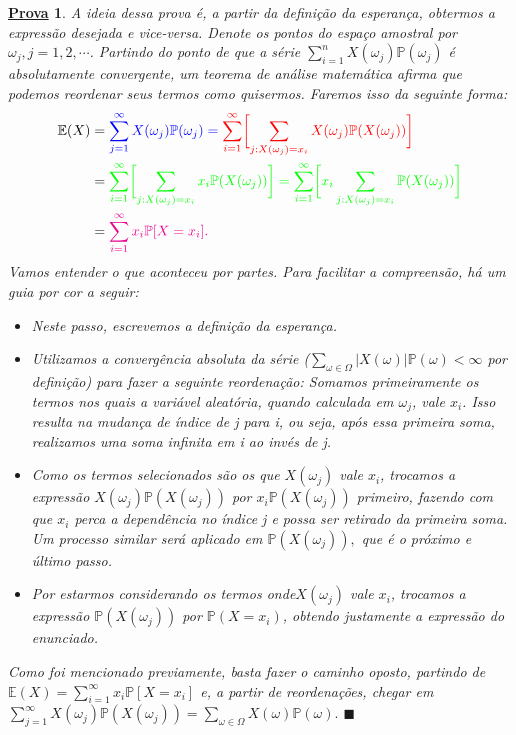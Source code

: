 \documentclass{article}
\newtheorem*{proof*}{\underline{Prova}}
\renewcommand\qedsymbol{$\blacksquare$}
\begin{document}
\begin{proof*}
  A ideia dessa prova é, a partir da definição da esperança, obtermos a expressão desejada e vice-versa.
  Denote os pontos do espaço amostral por \(\omega_{j}, j=1, 2, \cdots\). Partindo do ponto de que a série 
  \(\sum\limits_{i=1}^{n}X(\omega_{j})\mathbb{P}(\omega_{j})\) é absolutamente convergente, um teorema de análise
  matemática afirma que podemos reordenar seus termos como quisermos. Faremos isso da seguinte forma:
  \begin{align*}
    \mathbb{E}(X) &= \color{blue}\sum\limits_{j=1}^{\infty}X(\omega_{j})\mathbb{P}(\omega_{j}) = \color{red}\sum\limits_{i=1}^{\infty}\biggl[\sum\limits_{j:X(\omega_{j})=x_{i}}^{}X(\omega_{j})\mathbb{P}(X(\omega_{j}))\biggr]\\
                  &= \color{green}\sum\limits_{i=1}^{\infty}\biggl[\sum\limits_{j:X(\omega_{j}) = x_{i}}^{}x_{i}\mathbb{P}(X(\omega_{j}))\biggr]=\sum\limits_{i=1}^{\infty}\biggl[x_{i}\sum\limits_{j:X(\omega_{j})=x_{i}}^{}\mathbb{P}(X(\omega_{j}))\biggr]\\
                  &= \color{magenta}\sum\limits_{i=1}^{\infty}x_{i}\mathbb{P}[X = x_{i}].
  \end{align*}
  Vamos entender o que aconteceu por partes. Para facilitar a compreensão, há um guia por cor a seguir:
  \begin{itemize}
    \item[\textbf{Azul)}] Neste passo, escrevemos a definição da esperança.
    \item[\textbf{Vermelho)}] Utilizamos a convergência absoluta da série (\(\sum\limits_{\omega \in \Omega }^{}|X(\omega )|\mathbb{P}(\omega ) < \infty\) por definição) para
      fazer a seguinte reordenação: Somamos primeiramente os termos nos quais a variável aleatória, quando calculada em \(\omega_{j}\), vale \(x_{i}\). Isso resulta na mudança de índice de j
      para i, ou seja, após essa primeira soma, realizamos uma soma infinita em i ao invés de j.
    \item[\textbf{Verde)}] Como os termos selecionados são os que \(X(\omega_{j})\) vale \(x_{i}\), trocamos a expressão \(X(\omega_{j})\mathbb{P}(X(\omega_{j}))\) por
      \(x_{i}\mathbb{P}(X(\omega_{j}))\) primeiro, fazendo com que \(x_{i}\) perca a dependência no índice j e possa ser retirado da primeira soma. Um processo similar será aplicado em
      \(\mathbb{P}(X(\omega_{j})),\) que é o próximo e último passo.
    \item[\textbf{Magenta)}] Por estarmos considerando os termos onde\(X(\omega_{j})\) vale \(x_{i}\), trocamos a expressão \(\mathbb{P}(X(\omega_{j}))\) por \(\mathbb{P}(X = x_{i})\), 
      obtendo justamente a expressão do enunciado.
  \end{itemize}
  Como foi mencionado previamente, basta fazer o caminho oposto, partindo de \(\mathbb{E}(X) = \sum\limits_{i=1}^{\infty}x_{i}\mathbb{P}[X=x_{i}]\) e, a partir de 
  reordenações, chegar em \(\sum\limits_{j=1}^{\infty}X(\omega_{j})\mathbb{P}(X(\omega_{j})) = \sum\limits_{\omega \in \Omega }^{}X(\omega )\mathbb{P}(\omega ).\) \qedsymbol
\end{proof*}
\end{document}
